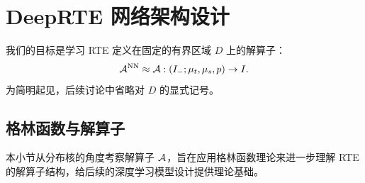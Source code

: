 

\section{DeepRTE 网络架构设计}
\label{sec:network-architecture}

我们的目标是学习 RTE 定义在固定的有界区域 $D$ 上的解算子：
\begin{equation}\label{eq:solution-op}
    \mathcal{A}^{\text{NN}} \approx \mathcal{A}: (I_{-}; \mu_t, \mu_s, p) \rightarrow I.
\end{equation}
为简明起见，后续讨论中省略对 $D$ 的显式记号。

\subsection{格林函数与解算子}

本小节从分布核的角度考察解算子 $\mathcal{A}$，旨在应用格林函数理论来进一步理解 RTE 的解算子结构，给后续的深度学习模型设计提供理论基础。

